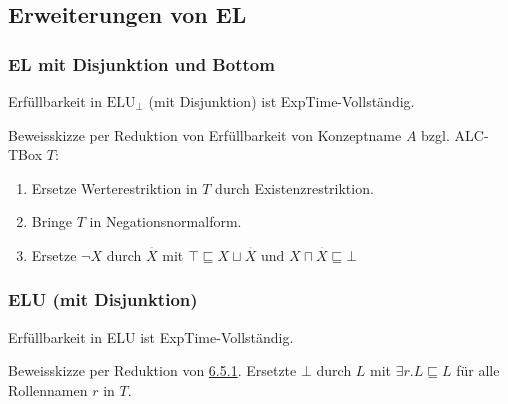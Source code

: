 \subsection{Erweiterungen von EL}\label{erweiterungen-von-el}

\hypertarget{el-mit-disjunktion-und-bottom}{\subsubsection{EL mit
Disjunktion und Bottom}\label{el-mit-disjunktion-und-bottom}}

Erfüllbarkeit in $\text{ELU}_{\bot}$ (mit Disjunktion) ist
ExpTime-Vollständig.

Beweisskizze per Reduktion von Erfüllbarkeit von Konzeptname $A$ bzgl.
ALC-TBox $T$:

\begin{enumerate}
\def\labelenumi{\arabic{enumi}.}
\item
  Ersetze Werterestriktion in $T$ durch Existenzrestriktion.
\item
  Bringe $T$ in Negationsnormalform.
\item
  Ersetze $\neg X$ durch $\overset{\overline{}}{X}$ mit
  $\top \sqsubseteq X \sqcup \overset{\overline{}}{X}$ und
  $X \sqcap \overset{\overline{}}{X} \sqsubseteq \bot$
\end{enumerate}

\subsubsection{ELU (mit Disjunktion)}\label{elu-mit-disjunktion}

Erfüllbarkeit in ELU ist ExpTime-Vollständig.

Beweisskizze per Reduktion von
\protect\hyperlink{el-mit-disjunktion-und-bottom}{6.5.1}. Ersetzte
$\bot$ durch $L$ mit $\exists r.L \sqsubseteq L$ für alle
Rollennamen $r$ in $T$.
